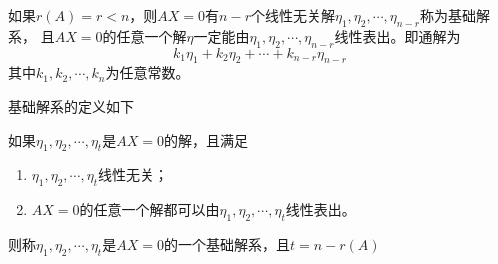 \begin{theorem}
    如果$r(A)=r<n$，则$AX=0$有$n-r$个线性无关解$\eta_1,\eta_2,\cdots,\eta_{n-r}$称为基础解系，
    且$AX=0$的任意一个解$\eta$一定能由$\eta_1,\eta_2,\cdots,\eta_{n-r}$线性表出。即通解为
    \[ k_1\eta_1 + k_2\eta_2 + \cdots + k_{n-r}\eta_{n-r} \]
    其中$k_1,k_2,\cdots,k_n$为任意常数。
\end{theorem}

基础解系的定义如下
\begin{definition}
    如果$\eta_1,\eta_2,\cdots,\eta_t$是$AX=0$的解，且满足
    \begin{enumerate}[(1)]
        \item $\eta_1,\eta_2,\cdots,\eta_t$线性无关；
        \item $AX=0$的任意一个解都可以由$\eta_1,\eta_2,\cdots,\eta_t$线性表出。
    \end{enumerate}
    则称$\eta_1,\eta_2,\cdots,\eta_t$是$AX=0$的一个基础解系，且$t=n-r(A)$
\end{definition}

